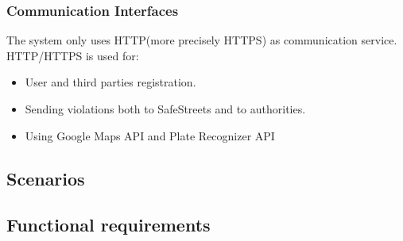 \documentclass{article}
\begin{document}
\subsubsection{Communication Interfaces}
The system only uses HTTP(more precisely HTTPS) as communication service.
HTTP/HTTPS is used for:
\begin{itemize}
    \item User and third parties registration.
    \item Sending violations both to SafeStreets and to authorities.
    \item Using Google Maps API and Plate Recognizer API
\end{itemize}
\subsection{Scenarios}

\newpage
\subsection{Functional requirements}
\end{document}
